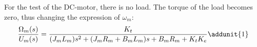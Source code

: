 For the test of the DC-motor, there is no load. The torque of the load becomes zero, thus changing the expression of $\omega_m$: 
\begin{equation}\label{eq:Omega_m}
	\frac{\Omega_m(s)}{U_m(s)} = \frac{K_t}{(J_mL_m)s^2 + (J_mR_m + B_mL_m)s + B_mR_m + K_tK_e} \addunit{1}
\end{equation}









